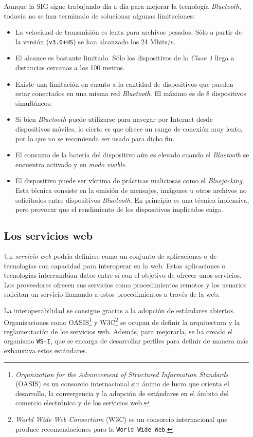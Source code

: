Aunque la \acs{SIG} sigue trabajando día a día para mejorar la tecnología
\emph{Bluetooth}, todavía no se han terminado de solucionar algunas
limitaciones:
\begin{itemize}
\item La velocidad de transmisión es lenta para archivos pesados. Sólo a
partir de la versión (\texttt{v3.0+HS}) se han alcanzado los 24 Mbits/s.
\item El alcance es bastante limitado. Sólo los dispositivos de la
\emph{Clase 1} llega a distancias cercanas a los 100 metros.
\item Existe una limitación en cuanto a la cantidad de dispositivos que pueden
estar conectados en una misma red \emph{Bluetooth}. El máximo es de 8
dispositivos simultáneos.
\item Si bien \emph{Bluetooth} puede utilizarse para navegar por Internet desde
dispositivos móviles, lo cierto es que ofrece un rango de conexión muy lento,
por lo que no se recomienda ser usado para dicho fin.
\item El consumo de la batería del dispositivo aún es elevado cuando el
\emph{Bluetooth} se encuentra activado y en \emph{modo visible}.
\item El dispositivo puede ser víctima de prácticas maliciosas como el
\emph{Bluejacking}. Esta técnica consiste en la emisión de mensajes, imágenes
u otros archivos no solicitados entre dispositivos \emph{Bluetooth}. En
principio es una técnica inofensiva, pero provocar que el rendimiento de los
dispositivos implicados caiga.
\end{itemize}


  \subsection{Los servicios web}

Un \emph{servicio web} podría definirse como un conjunto de aplicaciones o de 
tecnologías con capacidad para interoperar en la web. Estas aplicaciones o
tecnologías intercambian datos entre sí con el objetivo de ofrecer unos
servicios. Los proveedores ofrecen sus servicios como procedimientos remotos
y los usuarios solicitan un servicio llamando a estos procedimientos a través
de la web.

La interoperabilidad se consigue gracias a la adopción de estándares abiertos.
Organizaciones como \acs{OASIS}\footnote{\emph{Organization for the Advancement
of Structured Information Standards} (\acs{OASIS}) es un consorcio
internacional sin ánimo de lucro que orienta el desarrollo, la convergencia y
la adopción de estándares en el ámbito del comercio electrónico y de los
servicios web.} y \acs{W3C}\footnote{\emph{World Wide Web Consortium}
(\acs{W3C}) es un consorcio internacional que produce recomendaciones para la
\texttt{World Wide Web}.} se ocupan de definir la arquitectura y la
reglamentación de los servicios web. Además, para mejorarla, se ha creado el
organismo \texttt{WS-I}, que se encarga de desarrollar perfiles para definir
de manera más exhaustiva estos estándares.


